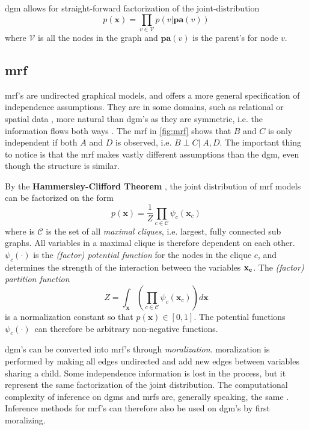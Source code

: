 \acrshort{dgm} allows for straight-forward factorization of the joint-distribution 
\begin{equation}\label{eq:dgm_factorization}
    p(\mathbf{x}) = \prod_{v \in \mathcal{V}}p(v | \mathbf{pa}(v))
\end{equation}
where $\mathcal{V}$ is all the nodes in the graph and $\mathbf{pa}(v)$ is the parent's for node $v$. 

\subsection{\acrfull{mrf}} \label{sec:mrf}

\acrshort{mrf}'s are undirected graphical models, and offers a more general specification of independence assumptions. They are in some domains, such as relational or spatial data , more natural than \acrshort{dgm}'s as they are symmetric, i.e. the information flows both ways \cite{murphy}. The \acrshort{mrf} in \cref{fig:mrf} shows that $B$ and $C$ is only independent if both $A$ and $D$ is observed, i.e. $B \perp C | \; A, D$. The important thing to notice is that the \acrshort{mrf} makes vastly different assumptions than the \acrshort{dgm}, even though the structure is similar.

By the \textbf{Hammersley-Clifford Theorem} \cite[p.~ 668]{murphy}, the joint distribution of \acrshort{mrf} models can be factorized on the form
\begin{equation}
    p(\mathbf{x}) =\frac{1}{Z} \prod_{c \in \mathcal{C}} \psi_c(\mathbf{x}_c)
\end{equation}
where is $\mathcal{C}$ is the set of all \textit{maximal cliques}, i.e. largest, fully connected sub graphs. All variables in a maximal clique is therefore dependent on each other. $\psi_c(\cdot)$ is the \textit{(factor) potential function} for the nodes in the clique $c$, and determines the strength of the interaction between the variables $\bf{x}_c$. The \textit{(factor) partition function}
\begin{equation}
    Z = \int_\mathbf{x} (\prod_{c \in \mathcal{C}} \psi_c(\mathbf{x}_c)) d \mathbf{x}
\end{equation}
is a normalization constant so that $p(\mathbf{x}) \in [0, 1]$. The potential functions $\psi_c(\cdot)$ can therefore be arbitrary non-negative functions. 

\acrshort{dgm}'s can be converted into \acrshort{mrf}'s through \textit{\gls{moralization}}. \Gls{moralization} is performed by making all edges undirected and add new edges between variables sharing a child. Some independence information is lost in the process, but it represent the same factorization of the joint distribution. The computational complexity of inference on \acrshort{dgm}s and \acrshort{mrf}s are, generally speaking, the same  \cite{murphy}. Inference methods for \acrshort{mrf}'s can therefore also be used on \acrshort{dgm}'s by first moralizing.


